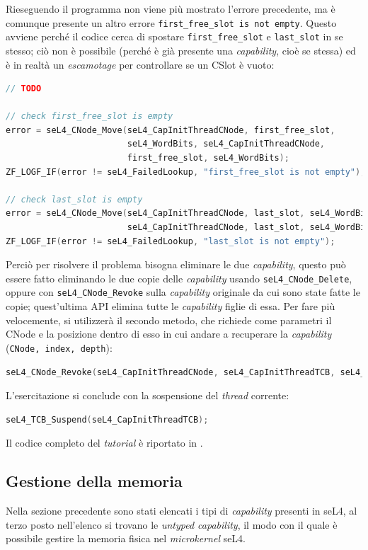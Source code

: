 Rieseguendo il programma non viene più mostrato l'errore precedente, ma è comunque presente un altro errore \texttt{first\_free\_slot is not empty}. Questo avviene perché il codice cerca di spostare \texttt{first\_free\_slot} e \texttt{last\_slot} in se stesso; ciò non è possibile (perché è già presente una \textit{capability}, cioè se stessa) ed è in realtà un \textit{escamotage} per controllare se un CSlot è vuoto:
\begin{lstlisting}[language=C++]
// TODO 
         
// check first_free_slot is empty
error = seL4_CNode_Move(seL4_CapInitThreadCNode, first_free_slot,
                        seL4_WordBits, seL4_CapInitThreadCNode, 
                        first_free_slot, seL4_WordBits);
ZF_LOGF_IF(error != seL4_FailedLookup, "first_free_slot is not empty");

// check last_slot is empty
error = seL4_CNode_Move(seL4_CapInitThreadCNode, last_slot, seL4_WordBits,
                        seL4_CapInitThreadCNode, last_slot, seL4_WordBits);
ZF_LOGF_IF(error != seL4_FailedLookup, "last_slot is not empty");
\end{lstlisting}

Perciò per risolvere il problema bisogna eliminare le due \textit{capability}, questo può essere fatto eliminando le due copie delle \textit{capability} usando \texttt{seL4\_CNode\_Delete}, oppure con \texttt{seL4\_CNode\_Revoke} sulla \textit{capability} originale da cui sono state fatte le copie; quest'ultima API elimina tutte le \textit{capability} figlie di essa. Per fare più velocemente, si utilizzerà il secondo metodo, che richiede come parametri il CNode e la posizione dentro di esso in cui andare a recuperare la \textit{capability} (\texttt{CNode, index, depth}):
\begin{lstlisting}[language=C++]
seL4_CNode_Revoke(seL4_CapInitThreadCNode, seL4_CapInitThreadTCB, seL4_WordBits);
\end{lstlisting}

L'esercitazione si conclude con la sospensione del \textit{thread} corrente:
\begin{lstlisting}[language=C++]
seL4_TCB_Suspend(seL4_CapInitThreadTCB);
\end{lstlisting}
Il codice completo del \textit{tutorial} è riportato in \cite{capability}.

\subsection{Gestione della memoria}
Nella sezione precedente sono stati elencati i tipi di \textit{capability} presenti in seL4, al terzo posto nell'elenco si trovano le \textit{untyped capability}, il modo con il quale è possibile gestire la memoria fisica nel \textit{microkernel} seL4.

